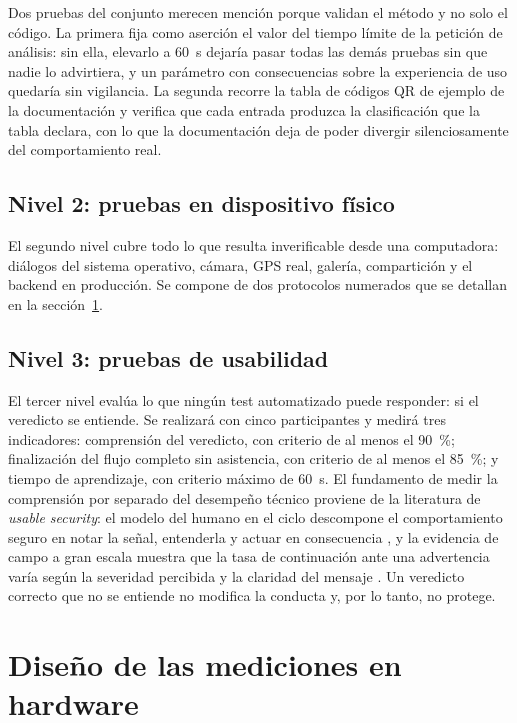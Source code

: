 Dos pruebas del conjunto merecen mención porque validan el método y no solo el código.
La primera fija como aserción el valor del tiempo límite de la petición de análisis:
sin ella, elevarlo a 60~s dejaría pasar todas las demás pruebas sin que nadie lo
advirtiera, y un parámetro con consecuencias sobre la experiencia de uso quedaría sin
vigilancia. La segunda recorre la tabla de códigos QR de ejemplo de la documentación y
verifica que cada entrada produzca la clasificación que la tabla declara, con lo que la
documentación deja de poder divergir silenciosamente del comportamiento real.

\subsection{Nivel 2: pruebas en dispositivo físico}

El segundo nivel cubre todo lo que resulta inverificable desde una computadora:
diálogos del sistema operativo, cámara, GPS real, galería, compartición y el backend
en producción. Se compone de dos protocolos numerados que se detallan en la
sección~\ref{sec:mediciones}.

\subsection{Nivel 3: pruebas de usabilidad}

El tercer nivel evalúa lo que ningún test automatizado puede responder: si el veredicto
se entiende. Se realizará con cinco participantes y medirá tres indicadores:
comprensión del veredicto, con criterio de al menos el 90~\%; finalización del flujo
completo sin asistencia, con criterio de al menos el 85~\%; y tiempo de aprendizaje,
con criterio máximo de 60~s. El fundamento de medir la comprensión por separado del
desempeño técnico proviene de la literatura de \emph{usable security}: el modelo del
humano en el ciclo descompone el comportamiento seguro en notar la señal, entenderla y
actuar en consecuencia \cite{cranor2008framework}, y la evidencia de campo a gran
escala muestra que la tasa de continuación ante una advertencia varía según la
severidad percibida y la claridad del mensaje \cite{akhawe2013alice}. Un veredicto
correcto que no se entiende no modifica la conducta y, por lo tanto, no protege.

\section{Diseño de las mediciones en hardware}
\label{sec:mediciones}

